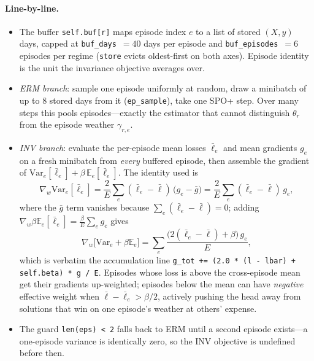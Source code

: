 \documentclass[11pt,a4paper]{article}
\theoremstyle{definition}
\theoremstyle{plain}
\newcommand{\E}{\mathbb{E}}
\newcommand{\Var}{\mathrm{Var}}
\begin{document}
\paragraph{Line-by-line.}
\begin{itemize}
  \item The buffer \texttt{self.buf[r]} maps episode index $e$ to a list of
        stored $(X, y)$ days, capped at \texttt{buf\_days}~$=40$ days per
        episode and \texttt{buf\_episodes}~$=6$ episodes per regime
        (\texttt{store} evicts oldest-first on both axes). Episode identity
        is the unit the invariance objective averages over.
  \item \emph{ERM branch}: sample one episode uniformly at random, draw a
        minibatch of up to 8 stored days from it (\texttt{ep\_sample}), take
        one SPO+ step. Over many steps this pools episodes---exactly the
        estimator that cannot distinguish $\theta_r$ from the episode
        weather $\gamma_{r,e}$.
  \item \emph{INV branch}: evaluate the per-episode mean losses $\bar\ell_e$
        and mean gradients $g_e$ on a fresh minibatch from \emph{every}
        buffered episode, then assemble the gradient of
        $\Var_e[\bar\ell_e] + \beta\, \E_e[\bar\ell_e]$. The identity used
        is
        \[
          \nabla_w \Var_e[\bar\ell_e]
          = \frac{2}{E} \sum_e (\bar\ell_e - \bar\ell)\,
            \big(g_e - \bar g\big)
          = \frac{2}{E} \sum_e (\bar\ell_e - \bar\ell)\, g_e,
        \]
        where the $\bar g$ term vanishes because
        $\sum_e (\bar\ell_e - \bar\ell) = 0$; adding
        $\nabla_w \beta \E_e[\bar\ell_e] = \frac{\beta}{E}\sum_e g_e$ gives
        \[
          \nabla_w \big[\Var_e + \beta \E_e\big]
          = \sum_e \frac{\big(2(\bar\ell_e - \bar\ell) + \beta\big)\, g_e}{E},
        \]
        which is verbatim the accumulation line
        \texttt{g\_tot += (2.0 * (l - lbar) + self.beta) * g / E}. Episodes
        whose loss is above the cross-episode mean get their gradients
        up-weighted; episodes below the mean can have \emph{negative}
        effective weight when $\bar\ell - \bar\ell_e > \beta/2$, actively
        pushing the head away from solutions that win on one episode's
        weather at others' expense.
  \item The guard \texttt{len(eps) < 2} falls back to ERM until a second
        episode exists---a one-episode variance is identically zero, so the
        INV objective is undefined before then.
\end{itemize}
\end{document}
